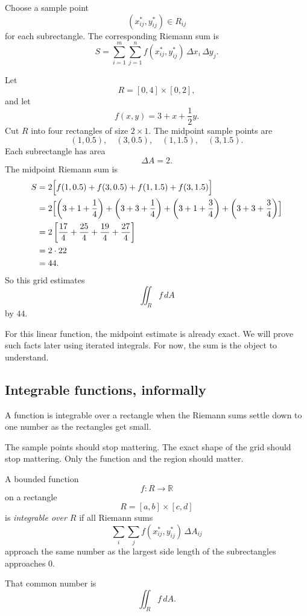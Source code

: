 Choose a sample point
\[
    (x_{ij}^*,y_{ij}^*)\in R_{ij}
\]
for each subrectangle.  The corresponding Riemann sum is
\[
\boxed{
    S=
    \sum_{i=1}^{m}\sum_{j=1}^{n}
    f(x_{ij}^*,y_{ij}^*)\,\Delta x_i\,\Delta y_j.
}
\]

\begin{example}
Let
\[
    R=[0,4]\times[0,2],
\]
and let
\[
    f(x,y)=3+x+\frac12y.
\]
Cut \(R\) into four rectangles of size \(2\times1\).  The midpoint sample points are
\[
    (1,0.5),\quad (3,0.5),\quad (1,1.5),\quad (3,1.5).
\]
Each subrectangle has area
\[
    \Delta A=2.
\]
The midpoint Riemann sum is
\[
\begin{aligned}
S
&=
2\Bigl[
f(1,0.5)+f(3,0.5)+f(1,1.5)+f(3,1.5)
\Bigr]\\
&=
2\Bigl[
\left(3+1+\frac14\right)
+\left(3+3+\frac14\right)
+\left(3+1+\frac34\right)
+\left(3+3+\frac34\right)
\Bigr]\\
&=
2\left[
\frac{17}{4}+\frac{25}{4}+\frac{19}{4}+\frac{27}{4}
\right]\\
&=
2\cdot 22\\
&=
44.
\end{aligned}
\]
So this grid estimates
\[
    \iint_R f\,dA
\]
by \(44\).
\end{example}

For this linear function, the midpoint estimate is already exact.  We will prove such
facts later using iterated integrals.  For now, the sum is the object to understand.

\subsection{Integrable functions, informally}

A function is integrable over a rectangle when the Riemann sums settle down to one
number as the rectangles get small.

The sample points should stop mattering.  The exact shape of the grid should stop
mattering.  Only the function and the region should matter.

\begin{definition}
A bounded function
\[
    f:R\to\mathbb R
\]
on a rectangle
\[
    R=[a,b]\times[c,d]
\]
is \emph{integrable over \(R\)} if all Riemann sums
\[
    \sum_i\sum_j f(x_{ij}^*,y_{ij}^*)\,\Delta A_{ij}
\]
approach the same number as the largest side length of the subrectangles approaches
\(0\).

That common number is
\[
\boxed{
    \iint_R f\,dA.
}
\]
\end{definition}

